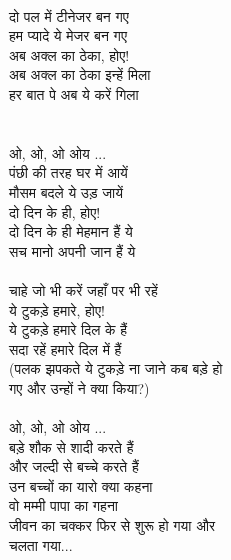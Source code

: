 {{{{{{{{{{{{{{{{{{{{\\
दो पल में टीनेजर बन गए\\
हम प्यादे ये मेजर बन गए\\
अब अक्ल का ठेका, होए!\\
अब अक्ल का ठेका इन्हें मिला\\
हर बात पे अब ये करें गिला\\
\\
\\
ओ, ओ, ओ ओय ... \\
पंछी की तरह घर में आयें\\
मौसम बदले ये उड़ जायें\\
दो दिन के ही, होए!\\
दो दिन के ही मेहमान हैं ये\\
सच मानो अपनी जान हैं ये\\
\\
चाहे जो भी करें जहाँ पर भी रहें\\
ये टुकड़े हमारे, होए!\\
ये टुकड़े हमारे दिल के हैं\\
सदा रहें हमारे दिल में हैं\\
(पलक झपकते ये टुकड़े ना जाने कब बड़े हो\\
गए और उन्हों ने क्या किया?)\\
\\
ओ, ओ, ओ ओय ... \\
बड़े शौक से शादी करते हैं\\
और जल्दी से बच्चे करते हैं\\
उन बच्चों का यारो क्या कहना\\
वो मम्मी पापा का गहना\\
जीवन का चक्कर फिर से शुरू हो गया और\\
चलता गया...\\
\\
}}}}}}}}}}}}}}}}}}}}

